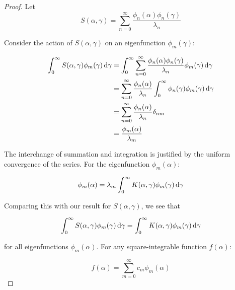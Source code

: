 \begin{proof}
Let
\begin{equation}
  S(\alpha, \gamma) = \sum_{n=0}^{\infty} \frac{\phi_n(\alpha) \phi_n(\gamma)}{\lambda_n}
\end{equation}

Consider the action of $S(\alpha, \gamma)$ on an eigenfunction $\phi_m(\gamma)$:

\begin{align}
  \int_0^\infty S(\alpha, \gamma) \phi_m(\gamma) \hspace{0.17em} \mathrm{d}\gamma 
  &= \int_0^\infty \sum_{n=0}^{\infty} \frac{\phi_n(\alpha) \phi_n(\gamma)}{\lambda_n} \phi_m(\gamma) \hspace{0.17em} \mathrm{d}\gamma \\
  &= \sum_{n=0}^{\infty} \frac{\phi_n(\alpha)}{\lambda_n} \int_0^\infty \phi_n(\gamma) \phi_m(\gamma) \hspace{0.17em} \mathrm{d}\gamma \\
  &= \sum_{n=0}^{\infty} \frac{\phi_n(\alpha)}{\lambda_n} \delta_{nm} \\
  &= \frac{\phi_m(\alpha)}{\lambda_m}
\end{align}

The interchange of summation and integration is justified by the uniform convergence of the series. For the eigenfunction $\phi_m(\alpha)$:

\begin{equation}
  \phi_m(\alpha) = \lambda_m \int_0^\infty K(\alpha, \gamma) \phi_m(\gamma) \hspace{0.17em} \mathrm{d}\gamma
\end{equation}

Comparing this with our result for $S(\alpha, \gamma)$, we see that

\begin{equation}
  \int_0^\infty S(\alpha, \gamma) \phi_m(\gamma) \hspace{0.17em} \mathrm{d}\gamma = \int_0^\infty K(\alpha, \gamma) \phi_m(\gamma) \hspace{0.17em} \mathrm{d}\gamma
\end{equation}

for all eigenfunctions $\phi_m(\alpha)$. For any square-integrable function $f(\alpha)$:

\begin{equation}
  f(\alpha) = \sum_{m=0}^{\infty} c_m \phi_m(\alpha)
\end{equation}


\end{proof}
